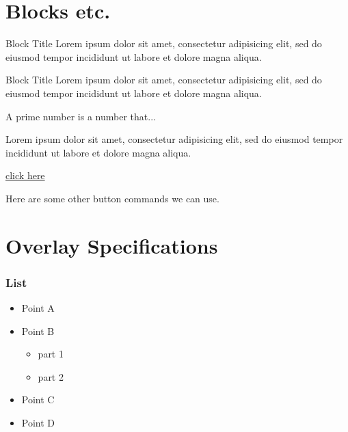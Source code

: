 \documentclass[14pt]{beamer}
\begin{document}
\section{Blocks etc.}

\begin{frame}
\begin{block}{Block Title}
	Lorem ipsum dolor sit amet, consectetur adipisicing elit, sed do eiusmod tempor incididunt ut labore et dolore magna aliqua.
\end{block}

\begin{alertblock}{Block Title}
	Lorem ipsum dolor sit amet, consectetur adipisicing elit, sed do eiusmod tempor incididunt ut labore et dolore magna aliqua.
\end{alertblock}

\begin{definition}
	A prime number is a number that...
\end{definition}

\begin{example}
	Lorem ipsum dolor sit amet, consectetur adipisicing elit, sed do eiusmod tempor incididunt ut labore et dolore magna aliqua.
\end{example}
\end{frame}


\begin{frame}
\label{contents}
\hyperlink{contents}{click here}

\hyperlink{contents}{}

Here are some other button commands we can use.

\hyperlink{columns}{}

\hyperlink{pictures}{}

\hyperlink{pictures}{}


\end{frame}


\section{Overlay Specifications}

\begin{frame}
\frametitle{List}
\begin{itemize}
	\pause
	\item Point A
	\pause
	\item Point B
	\begin{itemize}
		\pause
		\item part 1
		\pause
		\item part 2
	\end{itemize}
	\pause
	\item Point C
	\pause
	\item Point D
\end{itemize}
\end{frame}
\end{document}
